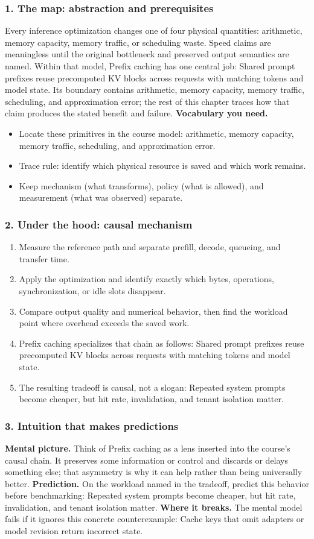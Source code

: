 \subsubsection*{1. The map: abstraction and prerequisites}
Every inference optimization changes one of four physical quantities: arithmetic, memory capacity, memory traffic, or scheduling waste. Speed claims are meaningless until the original bottleneck and preserved output semantics are named.
Within that model, Prefix caching has one central job: Shared prompt prefixes reuse precomputed KV blocks across requests with matching tokens and model state. Its boundary contains arithmetic, memory capacity, memory traffic, scheduling, and approximation error; the rest of this chapter traces how that claim produces the stated benefit and failure.
\textbf{Vocabulary you need.}\begin{itemize}
\item Locate these primitives in the course model: arithmetic, memory capacity, memory traffic, scheduling, and approximation error.
\item Trace rule: identify which physical resource is saved and which work remains.
\item Keep mechanism (what transforms), policy (what is allowed), and measurement (what was observed) separate.
\end{itemize}
\subsubsection*{2. Under the hood: causal mechanism}\begin{enumerate}
\item Measure the reference path and separate prefill, decode, queueing, and transfer time.
\item Apply the optimization and identify exactly which bytes, operations, synchronization, or idle slots disappear.
\item Compare output quality and numerical behavior, then find the workload point where overhead exceeds the saved work.
\item Prefix caching specializes that chain as follows: Shared prompt prefixes reuse precomputed KV blocks across requests with matching tokens and model state.
\item The resulting tradeoff is causal, not a slogan: Repeated system prompts become cheaper, but hit rate, invalidation, and tenant isolation matter.
\end{enumerate}
\subsubsection*{3. Intuition that makes predictions}
\textbf{Mental picture.} Think of Prefix caching as a lens inserted into the course's causal chain. It preserves some information or control and discards or delays something else; that asymmetry is why it can help rather than being universally better.
\textbf{Prediction.} On the workload named in the tradeoff, predict this behavior before benchmarking: Repeated system prompts become cheaper, but hit rate, invalidation, and tenant isolation matter.
\textbf{Where it breaks.} The mental model fails if it ignores this concrete counterexample: Cache keys that omit adapters or model revision return incorrect state.
